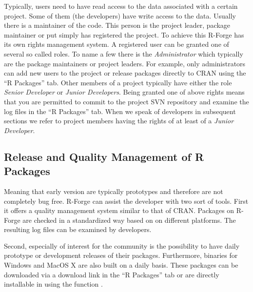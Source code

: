 

Typically, users need to have read access to the data associated with
a certain project. Some of them (the developers) have write access to
the data. Usually there is a maintainer of the code. This person is the project
leader, package maintainer or put simply has registered the
project. 
To achieve this R-Forge has its own rights management system. A
registered user can be 
granted one of several so called roles. To name a few there is
the \textit{Administrator} which typically are the package
maintainers or project leaders. For example, only  administrators can
add new users 
to the project or release packages directly to CRAN using the ``R Packages''
tab. Other members of a project typically have either the role \textit{Senior
Developer} or \textit{Junior Developers}. Being granted one of above
rights means that you are permitted to commit to the project
SVN repository and examine the log files in the ``R Packages'' tab.
When we speak of developers in subsequent sections we refer to project
members having the rights of at least of a \textit{Junior Developer}.


\subsection{Release and Quality Management of R Packages}

Meaning that early version are typically prototypes and therefore are
not completely bug free. R-Forge can assist the developer with two
sort of tools. First it offers a quality management system similar to
that of CRAN. Packages on R-Forge are checked in a
standardized way based on  on different
platforms. The resulting log files can be examined by developers.

Second, especially of interest for the \R{} community is the
possibility to have daily prototype or development releases
of their packages. Furthermore, binaries for Windows and MacOS X are
also built on a daily basis. These packages can be
downloaded via a download link in the ``R Packages'' tab or
are directly installable in \R{} using the function . 

